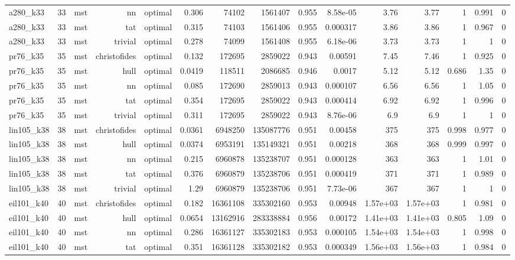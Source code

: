 \begin{tabular}{lrrrrrrrrrrrrrr}
a280\_k33 & 33 & mst & nn & optimal & 0.306 & 74102 & 1561407 & 0.955 & 8.58e-05 & 3.76 & 3.77 & 1 & 0.991 & 0 \\
a280\_k33 & 33 & mst & tat & optimal & 0.315 & 74103 & 1561406 & 0.955 & 0.000317 & 3.86 & 3.86 & 1 & 0.967 & 0 \\
a280\_k33 & 33 & mst & trivial & optimal & 0.278 & 74099 & 1561408 & 0.955 & 6.18e-06 & 3.73 & 3.73 & 1 & 1 & 0 \\
pr76\_k35 & 35 & mst & christofides & optimal & 0.132 & 172695 & 2859022 & 0.943 & 0.00591 & 7.45 & 7.46 & 1 & 0.925 & 0 \\
pr76\_k35 & 35 & mst & hull & optimal & 0.0419 & 118511 & 2086685 & 0.946 & 0.0017 & 5.12 & 5.12 & 0.686 & 1.35 & 0 \\
pr76\_k35 & 35 & mst & nn & optimal & 0.085 & 172690 & 2859013 & 0.943 & 0.000107 & 6.56 & 6.56 & 1 & 1.05 & 0 \\
pr76\_k35 & 35 & mst & tat & optimal & 0.354 & 172695 & 2859022 & 0.943 & 0.000414 & 6.92 & 6.92 & 1 & 0.996 & 0 \\
pr76\_k35 & 35 & mst & trivial & optimal & 0.311 & 172695 & 2859022 & 0.943 & 8.76e-06 & 6.9 & 6.9 & 1 & 1 & 0 \\
lin105\_k38 & 38 & mst & christofides & optimal & 0.0361 & 6948250 & 135087776 & 0.951 & 0.00458 & 375 & 375 & 0.998 & 0.977 & 0 \\
lin105\_k38 & 38 & mst & hull & optimal & 0.0374 & 6953191 & 135149321 & 0.951 & 0.00218 & 368 & 368 & 0.999 & 0.997 & 0 \\
lin105\_k38 & 38 & mst & nn & optimal & 0.215 & 6960878 & 135238707 & 0.951 & 0.000128 & 363 & 363 & 1 & 1.01 & 0 \\
lin105\_k38 & 38 & mst & tat & optimal & 0.376 & 6960879 & 135238706 & 0.951 & 0.000419 & 371 & 371 & 1 & 0.989 & 0 \\
lin105\_k38 & 38 & mst & trivial & optimal & 1.29 & 6960879 & 135238706 & 0.951 & 7.73e-06 & 367 & 367 & 1 & 1 & 0 \\
eil101\_k40 & 40 & mst & christofides & optimal & 0.182 & 16361108 & 335302160 & 0.953 & 0.00948 & 1.57e+03 & 1.57e+03 & 1 & 0.981 & 0 \\
eil101\_k40 & 40 & mst & hull & optimal & 0.0654 & 13162916 & 283338884 & 0.956 & 0.00172 & 1.41e+03 & 1.41e+03 & 0.805 & 1.09 & 0 \\
eil101\_k40 & 40 & mst & nn & optimal & 0.286 & 16361127 & 335302183 & 0.953 & 0.000105 & 1.54e+03 & 1.54e+03 & 1 & 0.998 & 0 \\
eil101\_k40 & 40 & mst & tat & optimal & 0.351 & 16361128 & 335302182 & 0.953 & 0.000349 & 1.56e+03 & 1.56e+03 & 1 & 0.984 & 0 \\

\end{tabular}
